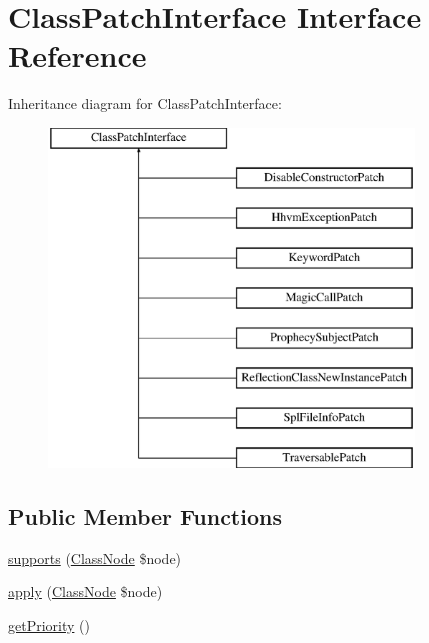 \hypertarget{interface_prophecy_1_1_doubler_1_1_class_patch_1_1_class_patch_interface}{}\section{Class\+Patch\+Interface Interface Reference}
\label{interface_prophecy_1_1_doubler_1_1_class_patch_1_1_class_patch_interface}
Inheritance diagram for Class\+Patch\+Interface\+:\begin{figure}[H]
\begin{center}
\leavevmode
\includegraphics[height=9.000000cm]{interface_prophecy_1_1_doubler_1_1_class_patch_1_1_class_patch_interface}
\end{center}
\end{figure}
\subsection*{Public Member Functions}
\begin{DoxyCompactItemize}
\item 
\mbox{\hyperlink{interface_prophecy_1_1_doubler_1_1_class_patch_1_1_class_patch_interface_a99b2455ac194faf79aff042c55719ac2}{supports}} (\mbox{\hyperlink{class_prophecy_1_1_doubler_1_1_generator_1_1_node_1_1_class_node}{Class\+Node}} \$node)
\item 
\mbox{\hyperlink{interface_prophecy_1_1_doubler_1_1_class_patch_1_1_class_patch_interface_a62fdb697928f35fc782d6889b8fe9b8b}{apply}} (\mbox{\hyperlink{class_prophecy_1_1_doubler_1_1_generator_1_1_node_1_1_class_node}{Class\+Node}} \$node)
\item 
\mbox{\hyperlink{interface_prophecy_1_1_doubler_1_1_class_patch_1_1_class_patch_interface_a1e7a3c168dcd0901a0d2669c67575b55}{get\+Priority}} ()
\end{DoxyCompactItemize}


